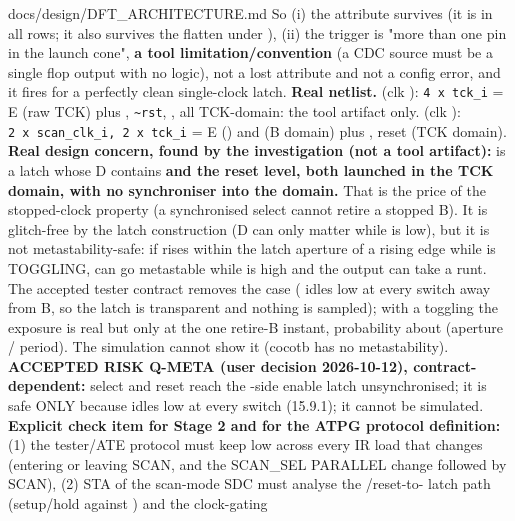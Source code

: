 \begin{relocated}{docs/design/DFT_ARCHITECTURE.md}
So (i) the attribute survives (it is  in all rows; it also
survives the flatten under ), (ii) the trigger is "more
than one pin in the launch cone", \textbf{a tool
limitation/\allowbreak{}convention} (a CDC source must be a single flop
output with no logic), not a lost attribute and not a config error, and
it fires for a perfectly clean single-clock latch. \textbf{Real
netlist.}  (clk ):
\texttt{4\ x\ tck\_\allowbreak{}i} = E (raw TCK) plus ,
\texttt{\textasciitilde{}rst}, , all TCK-domain: the
tool artifact only.  (clk ):
\texttt{2\ x\ scan\_\allowbreak{}clk\_\allowbreak{}i,\allowbreak{}\ 2\ x\ tck\_\allowbreak{}i}
= E () and  (B domain) plus
, reset (TCK domain). \textbf{Real design concern, found by
the investigation (not a tool artifact):}  is a latch whose
D contains \textbf{ and the reset level, both launched in
the TCK domain, with no synchroniser into the  domain.}
That is the price of the stopped-clock property (a synchronised select
cannot retire a stopped B). It is glitch-free by the latch construction
(D can only matter while  is low), but it is not
metastability-safe: if  rises within the latch aperture of a
 rising edge while  is TOGGLING,
 can go metastable while  is high and the
output can take a runt. The accepted tester contract removes the case
( idles low at every switch away from B, so the latch
is transparent and nothing is sampled); with a toggling
 the exposure is real but only at the one retire-B
instant, probability about (aperture / period). The simulation cannot
show it (cocotb has no metastability). \textbf{ACCEPTED RISK Q-META
(user decision 2026-10-12), contract-dependent:} select and reset reach
the -side enable latch unsynchronised; it is safe ONLY
because  idles low at every switch (15.9.1); it cannot
be simulated. \textbf{Explicit check item for Stage 2 and for the ATPG
protocol definition:} (1) the tester/\allowbreak{}ATE protocol must keep
 low across every IR load that changes 
(entering or leaving SCAN, and the SCAN\_SEL PARALLEL change followed by
SCAN), (2) STA of the scan-mode SDC must analyse the
/\allowbreak{}reset-to- latch path
(setup/\allowbreak{}hold against ) and the clock-gating

\end{relocated}
